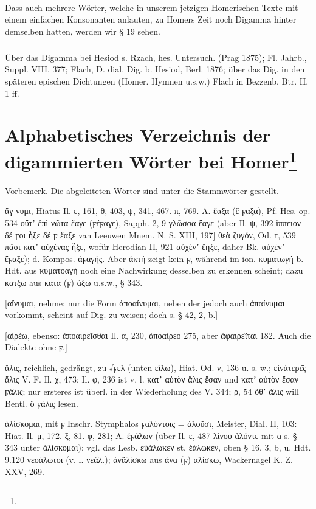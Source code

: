 \paragraph{}Dass auch mehrere Wörter, welche in unserem jetzigen Homerischen
Texte mit einem einfachen Konsonanten anlauten, zu Homers Zeit noch Digamma
hinter demselben hatten, werden wir § 19 sehen. 

{\small\noindent\subparagraph{} Über das Digamma bei Hesiod s. Rzach, hes.
Untersuch. (Prag 1875); Fl. Jahrb., Suppl. VIII, 377; Flach, D. dial. Dig. b.
Hesiod, Berl. 1876; über das Dig. in den späteren epischen Dichtungen (Homer.
Hymnen u.s.w.) Flach in Bezzenb. Btr. II, 1 ff.}

\section[Alphabetisches Verzeichnis der digammierten Wörter bei
  Homer]{Alphabetisches Verzeichnis der digammierten Wörter bei
  Homer\protect\footnote{}}\label{sec:digammahomer}


{\small\noindent Vorbemerk. Die abgeleiteten Wörter sind unter die Stammwörter
gestellt.}

ἄγ-νυμι, Hiatus Il. ε, 161, θ, 403, ψ, 341, 467. π, 769. Α. ἔαξα (ἔ-ϝαξα), Pf.
Hes. op. 534 οὔτʼ ἐπὶ νῶτα ἔαγε (ϝέϝαγε), Sapph. 2, 9 γλῶσσα ἔαγε (aber Il. ψ,
392 ἵππειον δέ ϝοι ἦξε δέ ϝ ἔαξε van Leeuwen Mnem. N. S. XIII, 197] θεὰ ζυγόν,
Od. τ, 539 πᾶσι κατʼ αὐχένας ἦξε, wofür Herodian II, 921 αὐχένʼ ἔηξε, daher Bk.
αὐχένʼ ἔϝαξε); d. Kompos. ἀϝαγής. Aber ἀκτή zeigt kein ϝ, während im ion.
κυματωγή b. Hdt. aus κυματοαγή noch eine Nachwirkung desselben zu erkennen
scheint; dazu κατξω aus κατα (ϝ) άξω u.s.w., § 343. 

[αἴνυμαι, nehme: nur die Form ἀποαίνυμαι, neben der jedoch auch ἀπαίνυμαι
vorkommt, scheint auf Dig. zu weisen; doch s. § 42, 2, b.] 

[αἱρέω, ebenso: ἀποαιρεῖσθαι Il. α, 230, ἀποαίρεο 275, aber ἀφαιρεῖται 182. Auch
die Dialekte ohne ϝ.] 

ἅλις, reichlich, gedrängt, zu √ϝελ (unten εἴλω), Hiat. Od. ν, 136 u. s.
w.; εἰνάτερε̄ς ἅλις V. F. Il. χ, 473; Il. φ, 236 ist v. l. κατʼ αὐτὸν ἅλις ἔσαν
und κατʼ αὐτὸν ἔσαν ϝάλις; nur ersteres ist überl. in der Wiederholung des V.
344; ρ, 54 ὅθʼ ἅλις will Bentl. ὃ ϝάλις lesen. 

ἁλίσκομαι, mit ϝ Inschr. Stymphalos ϝαλόντοις = ἁλοῦσι, Meister, Dial. II, 103:
Hiat. Il. μ, 172. ξ, 81. φ, 281; Α. ἐϝάλων (über Il. ε, 487 λίνου ἁλόντε mit ᾱ
s. § 343 unter ἁλίσκομαι); vgl. das Lesb. εὐάλωκεν st. ἑάλωκεν, oben § 16, 3, b,
u. Hdt. 9.120 νεοάλωτοι (v. l. νεάλ.); ἀνᾶλίσκω aus ἀνα (ϝ) αλίσκω, Wackernagel
K. Z. XXV, 269. 

